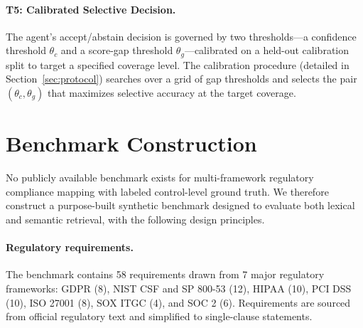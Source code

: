 \documentclass{sn-jnl}
\begin{document}
\paragraph{T5: Calibrated Selective Decision.}
The agent's accept/abstain decision is governed by two thresholds---a confidence threshold $\theta_c$ and a score-gap threshold $\theta_g$---calibrated on a held-out calibration split to target a specified coverage level.
The calibration procedure (detailed in Section~\ref{sec:protocol}) searches over a grid of gap thresholds and selects the pair $(\theta_c, \theta_g)$ that maximizes selective accuracy at the target coverage.


\section{Benchmark Construction}
\label{sec:dataset}

No publicly available benchmark exists for multi-framework regulatory compliance mapping with labeled control-level ground truth.
We therefore construct a purpose-built synthetic benchmark designed to evaluate both lexical and semantic retrieval, with the following design principles.

\paragraph{Regulatory requirements.}
The benchmark contains 58 requirements drawn from 7 major regulatory frameworks: GDPR (8), NIST CSF and SP 800-53 (12), HIPAA (10), PCI DSS (10), ISO 27001 (8), SOX ITGC (4), and SOC 2 (6).
Requirements are sourced from official regulatory text and simplified to single-clause statements.
\end{document}
